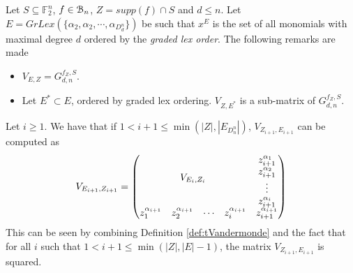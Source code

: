 \documentclass[11pt]{llncs}
\begin{document}
\begin{remark}\label{rem:subsetOfReedMuller}
    Let $S\subseteq \mathbb{F}_2^n$, $f \in \mathcal{B}_{n}$, $Z = supp(f) \cap S$ and $d \leq n$. Let $E = GrLex(\{\alpha_2, \alpha_2, \cdots, \alpha_{D_d^n}\})$ be such that $x^E$ is the set of all monomials with maximal degree $d$ ordered by the \textit{graded lex order}. The following remarks are made
    \begin{itemize}
        \item $V_{E,Z} = G_{d,n}^{f_{Z},S}$.
        \item Let $E^{*}\subset E$, ordered by graded lex ordering. $V_{Z,E^{*}}$ is a sub-matrix of $G_{d,n}^{f_Z, S}$.
    \end{itemize}
\end{remark}

\begin{remark}\label{rem:squareConstruction}
    Let $i\geq 1$. We have that if $1< i+1 \leq \min{\left(|Z|, |E_{D_n^n}|\right)}$, $V_{Z_{i+1}, E_{i+1}}$ can be computed as
    \begin{align*}
        V_{E_{i+1}, Z_{i+1}} = 
        \begin{pmatrix}
        \multicolumn{4}{c}{\multirow{4}{*}{$V_{E_{i}, Z_{i}}$}} & z_{i+1}^{\alpha_{1}}\\
        & & & & z_{i+1}^{\alpha_{2}}\\
        & & & & \vdots\\
        & & & & z_{i+1}^{\alpha_{i}}\\
        z_1^{\alpha_{i+1}} & z_2^{\alpha_{i+1}}& \cdots & z_{i}^{\alpha_{i+1}} & z_{i+1}^{\alpha_{i+1}}
    \end{pmatrix}
    \end{align*}
    This can be seen by combining Definition \ref{def:tVandermonde} and the fact that for all $i$ such that $1< i+1 \leq \min{\left(|Z|, |E|-1\right)}$, the matrix $V_{Z_{i+1}, E_{i+1}}$ is squared.
\end{remark}
\end{document}
